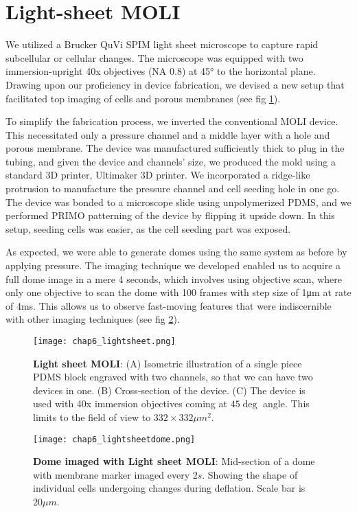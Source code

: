 \hypertarget{light-sheet-moli}{%
\section{Light-sheet MOLI}\label{light-sheet-moli}}

We utilized a Brucker QuVi SPIM light sheet microscope to capture rapid subcellular or cellular changes. The microscope was equipped with two immersion-upright 40x objectives (NA 0.8) at 45\unit{\degree} to the horizontal plane. Drawing upon our proficiency in device fabrication, we devised a new setup that facilitated top imaging of cells and porous membranes (see fig \ref{fig_6_8}).

To simplify the fabrication process, we inverted the conventional MOLI device. This necessitated only a pressure channel and a middle layer with a hole and porous membrane. The device was manufactured sufficiently thick to plug in the tubing, and given the device and channels' size, we produced the mold using a standard 3D printer, Ultimaker 3D printer. We incorporated a ridge-like protrusion to manufacture the pressure channel and cell seeding hole in one go. The device was bonded to a microscope slide using unpolymerized PDMS, and we performed PRIMO patterning of the device by flipping it upside down. In this setup, seeding cells was easier, as the cell seeding part was exposed.

As expected, we were able to generate domes using the same system as before by applying pressure. The imaging technique we developed enabled us to acquire a full dome image in a mere 4 seconds, which involves using objective scan, where only one objective to scan the dome with 100 frames with step size of 1\unit{\um} at rate of 4\unit{\ms}. This allows us to observe fast-moving features that were indiscernible with other imaging techniques (see fig \ref{fig_6_9}).

\begin{figure}[]
	\centering
	\texttt{[image: chap6\_lightsheet.png]}
	\caption{ \textbf{Light sheet MOLI}: (A) Isometric illustration of a single piece PDMS block engraved with two channels, so that we can have two devices in one. (B) Cross-section of the device. (C) The device is used with 40x immersion objectives coming at $45 \deg$ angle. This limits to the field of view to $332\times 332\mu m^2$.
	}\label{fig_6_8}
\end{figure}

\begin{figure}[]
	\centering
	\texttt{[image: chap6\_lightsheetdome.png]}
	\caption{ \textbf{Dome imaged with Light sheet MOLI}: Mid-section of a dome with membrane marker imaged every $2s$. Showing the shape of individual cells undergoing changes during deflation. Scale bar is $20 \mu m$.
	}\label{fig_6_9}
\end{figure}


